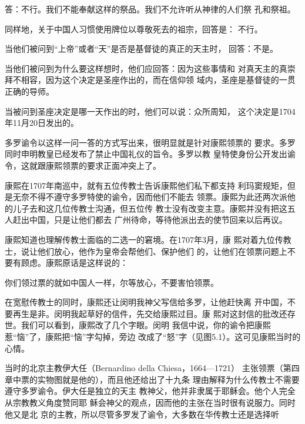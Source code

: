 {\bookkai 答：不行。我们不能奉献这样的祭品。我们不允许听从神律的人们祭}%
{\bookkai 孔和祭祖。}%
\par
{\bookkai 同样地，关于中国人习惯使用牌位以尊敬死去的祖宗，回答是：}%
{\bookkai 不行。}%
\par
{\bookkai 当他们被问到“上帝”或者“天”是否是基督徒的真正的天主时，}%
{\bookkai 回答：不是。}%
\par
{\bookkai 当他们被问到为什么要这样想时，他们应回答：因为这些事情和}%
{\bookkai 对真天主的真崇拜不相容，因为这个决定是圣座作出的，而在信仰领}%
{\bookkai 域内，圣座是基督徒的一贯正确的导师。}%
\par
{\bookkai 当被问到圣座决定是哪一天作出的时，他们可以说：众所周知，}%
{\bookkai 这个决定是1704年11月20日发出的。}{\bookkai {}}%
\par
多罗谕令以这样一问一答的方式写出来，很明显就是针对康熙领票的%
要求。多罗同时申明教皇已经发布了禁止中国礼仪的旨令。多罗以教%
皇特使身份公开发出谕令，这就跟康熙领票的要求正面冲突上了。%
\par
康熙在1707年南巡中，就有五位传教士告诉康熙他们私下都支持%
利玛窦规矩，但是无奈不得不遵守多罗特使的谕令，因而他们不能去%
领票。康熙为此还两次派他的儿子去和这几位传教士沟通，但五位传%
教士没有改变主意。康熙并没有把这五人赶出中国，只是让他们都去%
广州待命，等待他派出去的使节回来以后再议。%
\par
康熙知道也理解传教士面临的二选一的窘境。在1707年3月，康%
熙对着九位传教士，说让他们放心，他作为皇帝会帮他们、保护他们%
的，让他们在领票问题上不要有顾虑。康熙原话是这样说的：%
\par
{\bookkai 你们领过票的就如中国人一样，尔等放心，不要害怕领票。}%
\par
在宽慰传教士的同时，康熙还让闵明我神父写信给多罗，让他赶快离%
开中国，不要再生是非。闵明我起草好的信件，先交给康熙过目。康%
熙对这封信的批改还存世。我们可以看到，康熙改了几个字眼。闵明%
我信中说，你的谕令把康熙惹“恼”了，康熙把“恼”字勾掉，旁边%
改成了“怒”字（见图5.1）。这可见康熙当时的心情。%
\par
当时的北京主教伊大任（Bernardino della Chiesa，1664—1721）%
主张领票（第四章中票的实物图就是他的），而且他还给出了十九条%
理由解释为什么传教士不需要遵守多罗谕令。伊大任是独立的天主%
教神父，他并非隶属于耶稣会。他个人完全从宗教教义角度赞同耶%
稣会神父的观点，因而他的主张在当时很有说服力。同时他又是北%
京的主教，所以尽管多罗发了谕令，大多数在华传教士还是选择听%
